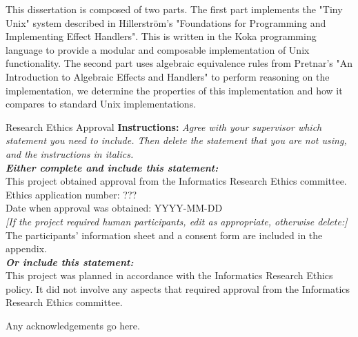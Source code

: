 \documentclass[logo,bsc,singlespacing,parskip]{infthesis}
\begin{document}
\begin{preliminary}
{This dissertation is composed of two parts. The first part implements the "Tiny Unix" system described in Hillerström's "Foundations for Programming and Implementing Effect Handlers". This is written in the Koka programming language to provide a modular and composable implementation of Unix functionality. The second part uses algebraic equivalence rules from Pretnar's "An Introduction to Algebraic Effects and Handlers" to perform reasoning on the implementation, we determine the properties of this implementation and how it compares to standard Unix implementations. 



}

\maketitle

\newenvironment{ethics}
   {\begin{frontenv}{Research Ethics Approval}{\LARGE}}
   {\end{frontenv}\newpage}

\begin{ethics}
\textbf{Instructions:} \emph{Agree with your supervisor which
statement you need to include. Then delete the statement that you are not using,
and the instructions in italics.\\
\textbf{Either complete and include this statement:}}\\ %
%
This project obtained approval from the Informatics Research Ethics committee.\\
Ethics application number: ???\\
Date when approval was obtained: YYYY-MM-DD\\
%
\emph{[If the project required human participants, edit as appropriate, otherwise delete:]}\\ %
The participants' information sheet and a consent form are included in the appendix.\\
%
\textbf{\emph{Or include this statement:}}\\ %
This project was planned in accordance with the Informatics Research
Ethics policy. It did not involve any aspects that required approval
from the Informatics Research Ethics committee.

\standarddeclaration
\end{ethics}


\begin{acknowledgements}
Any acknowledgements go here.
\end{acknowledgements}


\tableofcontents
\end{preliminary}
\end{document}
